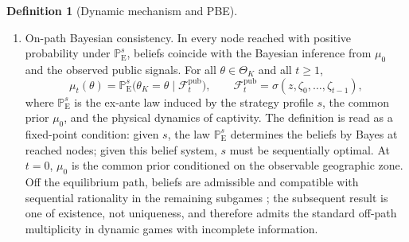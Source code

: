 \documentclass[review,authoryear,12pt]{elsarticle}
\providecommand{\textcite}{\citet}
\theoremstyle{plain}
\theoremstyle{definition}
\newtheorem{definition}[theorem]{Definition}
\newcommand{\ProbE}{\mathbb{P}_{\mathrm{E}}}
\newcommand{\ThetaK}{\Theta_K}
\newcommand{\1}{\mathbf{1}}
\begin{document}
\begin{definition}[Dynamic mechanism and PBE]
\begin{enumerate}
  \item[\textup{(b)}] On-path Bayesian consistency. In every node reached with positive probability under $\ProbE^s$, beliefs coincide with the Bayesian inference from $\mu_0$ and the observed public signals. For all $\theta\in\ThetaK$ and all $t\ge 1$,
  \begin{equation}
  \label{eq:def712-bayes-mu}
  \mu_t(\theta)=\ProbE^s\!\bigl(\theta_K=\theta\mid \mathcal{F}_t^{\mathrm{pub}}\bigr),
  \qquad
  \mathcal{F}_t^{\mathrm{pub}}=\sigma(z,\zeta_0,\ldots,\zeta_{t-1}),
  \end{equation}
  where $\ProbE^s$ is the ex-ante law induced by the strategy profile $s$, the common prior $\mu_0$, and the physical dynamics of captivity. The definition is read as a fixed-point condition: given $s$, the law $\ProbE^s$ determines the beliefs by Bayes at reached nodes; given this belief system, $s$ must be sequentially optimal. At $t=0$, $\mu_0$ is the common prior conditioned on the observable geographic zone. Off the equilibrium path, beliefs are admissible and compatible with sequential rationality in the remaining subgames \textcite{FudenbergTirole1991,KrepsWilson1982}; the subsequent result is one of existence, not uniqueness, and therefore admits the standard off-path multiplicity in dynamic games with incomplete information.
\end{enumerate}
\end{definition}
\end{document}
